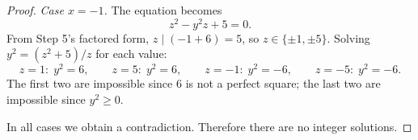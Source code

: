 \documentclass[12pt]{article}
\begin{document}
\begin{proof}
\smallskip

\emph{Case $x=-1$.} The equation becomes
\[
z^2 - y^2 z + 5 = 0.
\]
From Step 5's factored form, $z \mid (-1+6)=5$, so $z \in \{\pm 1,\pm 5\}$.
Solving $y^2 = (z^2+5)/z$ for each value:
\[
z = 1:\; y^2 = 6,\qquad z = 5:\; y^2 = 6,\qquad z = -1:\; y^2 = -6,\qquad z = -5:\; y^2 = -6.
\]
The first two are impossible since $6$ is not a perfect square; the last two are impossible
since $y^2 \geq 0$.

\medskip

In all cases we obtain a contradiction. Therefore there are no integer solutions.
\end{proof}
\end{document}

